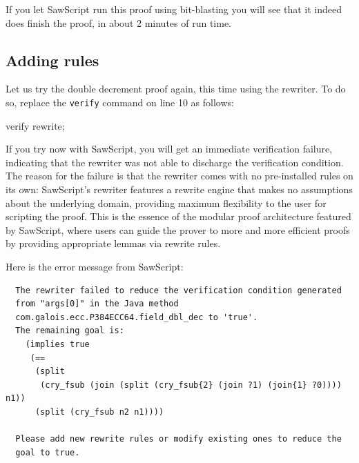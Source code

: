 \documentclass[12pt]{galois-whitepaper}
\newcommand{\sawScript}{{\sc SawScript}\xspace}
\begin{document}
If you let \sawScript run this proof using bit-blasting you will
see that it indeed does finish the proof, in about 2 minutes of run time.

\subsection{Adding rules}
Let us try the double decrement proof again, this time using the rewriter. To do so, replace the
{\tt verify} command on line 10 as follows:

\begin{code}
   verify rewrite;
\end{code}

If you try now with \sawScript, you will get an immediate verification failure, indicating that the rewriter was not able to discharge
the verification condition. The reason for the failure is that the rewriter comes with no pre-installed rules on its own: \sawScript's
rewriter features a rewrite engine that makes no assumptions about the underlying domain, providing maximum flexibility to the user
for scripting the proof. This is the essence of the modular proof architecture featured by \sawScript, where users can guide the prover
to more and more efficient proofs by providing appropriate lemmas via rewrite rules.

Here is the error message from \sawScript:
\begin{Verbatim}
  The rewriter failed to reduce the verification condition generated
  from "args[0]" in the Java method
  com.galois.ecc.P384ECC64.field_dbl_dec to 'true'.
  The remaining goal is:
    (implies true
     (==
      (split
       (cry_fsub (join (split (cry_fsub{2} (join ?1) (join{1} ?0)))) n1))
      (split (cry_fsub n2 n1))))

  Please add new rewrite rules or modify existing ones to reduce the
  goal to true.
\end{Verbatim}
\end{document}
